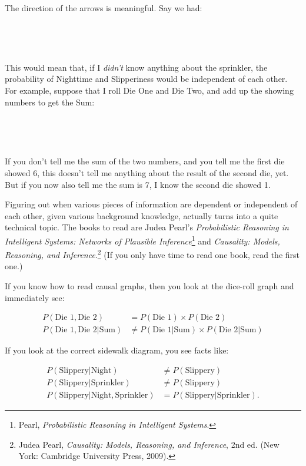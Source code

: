 {
 The direction of the arrows is meaningful. Say we had:}

{
 ~}


{
 ~}

{
 This would mean that, if I \textit{didn't} know
anything about the sprinkler, the probability of Nighttime and
Slipperiness would be independent of each other. For example, suppose
that I roll Die One and Die Two, and add up the showing numbers to get
the Sum:}

{
 ~}



{
 ~}

{
 If you don't tell me the sum of the two numbers,
and you tell me the first die showed 6, this doesn't
tell me anything about the result of the second die, yet. But if you
now also tell me the sum is 7, I know the second die showed 1.}

{
 Figuring out when various pieces of information are dependent or
independent of each other, given various background knowledge, actually
turns into a quite technical topic. The books to read are Judea
Pearl's \textit{Probabilistic Reasoning in Intelligent
Systems: Networks of Plausible Inference}\footnote{Pearl, \textit{Probabilistic Reasoning in Intelligent
Systems}.} and
\textit{Causality: Models, Reasoning, and
Inference}.\footnote{Judea Pearl, \textit{Causality: Models, Reasoning, and
Inference}, 2nd ed. (New York: Cambridge University Press, 2009).} (If you only have time to read one book,
read the first one.)}

{
 If you know how to read causal graphs, then you look at the
dice-roll graph and immediately see:}

\begin{align*}
 P(\text{Die 1},\text{Die 2}) &= P(\text{Die 1}) \times P(\text{Die 2})\\
 P(\text{Die 1},\text{Die 2}|\text{Sum}) &\neq P(\text{Die 1}|\text{Sum})
 \times P(\text{Die 2}|\text{Sum})
\end{align*}

{
 If you look at the correct sidewalk diagram, you see facts like:}

\begin{align*}
 P(\text{Slippery}|\text{Night}) &\neq P(\text{Slippery}) \\
 P(\text{Slippery}|\text{Sprinkler}) &\neq P(\text{Slippery})\\
 P(\text{Slippery}|\text{Night}, \text{Sprinkler}) &= P(\text{Slippery}|\text{Sprinkler}).
\end{align*}


